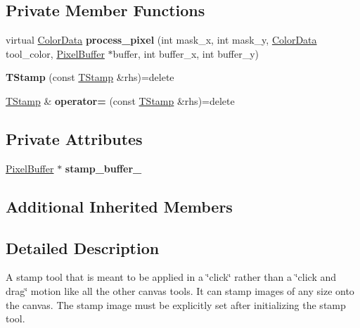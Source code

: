 \subsection*{Private Member Functions}
\begin{DoxyCompactItemize}
\item 
virtual \hyperlink{classimage__tools_1_1ColorData}{Color\+Data} {\bfseries process\+\_\+pixel} (int mask\+\_\+x, int mask\+\_\+y, \hyperlink{classimage__tools_1_1ColorData}{Color\+Data} tool\+\_\+color, \hyperlink{classimage__tools_1_1PixelBuffer}{Pixel\+Buffer} $\ast$buffer, int buffer\+\_\+x, int buffer\+\_\+y)\hypertarget{classimage__tools_1_1TStamp_a656bb0af6d8f5ad6994caac1cf33d562}{}\label{classimage__tools_1_1TStamp_a656bb0af6d8f5ad6994caac1cf33d562}

\item 
{\bfseries T\+Stamp} (const \hyperlink{classimage__tools_1_1TStamp}{T\+Stamp} \&rhs)=delete\hypertarget{classimage__tools_1_1TStamp_a86d6a6f4d87448aa40a15dfb739bc7ed}{}\label{classimage__tools_1_1TStamp_a86d6a6f4d87448aa40a15dfb739bc7ed}

\item 
\hyperlink{classimage__tools_1_1TStamp}{T\+Stamp} \& {\bfseries operator=} (const \hyperlink{classimage__tools_1_1TStamp}{T\+Stamp} \&rhs)=delete\hypertarget{classimage__tools_1_1TStamp_a30811bc3e0797e245cb668980bab288f}{}\label{classimage__tools_1_1TStamp_a30811bc3e0797e245cb668980bab288f}

\end{DoxyCompactItemize}
\subsection*{Private Attributes}
\begin{DoxyCompactItemize}
\item 
\hyperlink{classimage__tools_1_1PixelBuffer}{Pixel\+Buffer} $\ast$ {\bfseries stamp\+\_\+buffer\+\_\+}\hypertarget{classimage__tools_1_1TStamp_a4a2d09261b405196933e80b0be51889e}{}\label{classimage__tools_1_1TStamp_a4a2d09261b405196933e80b0be51889e}

\end{DoxyCompactItemize}
\subsection*{Additional Inherited Members}


\subsection{Detailed Description}
A stamp tool that is meant to be applied in a \char`\"{}click\char`\"{} rather than a \char`\"{}click and drag\char`\"{} motion like all the other canvas tools. It can stamp images of any size onto the canvas. The stamp image must be explicitly set after initializing the stamp tool. 

